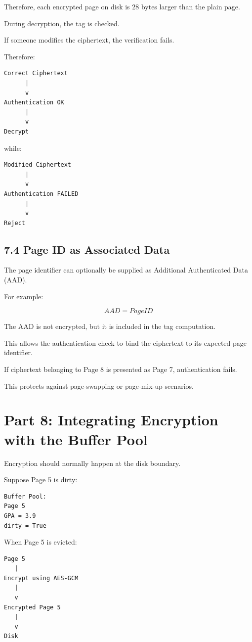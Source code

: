 \documentclass[12pt,a4paper]{article}
\begin{document}
Therefore, each encrypted page on disk is 28 bytes larger than the plain page.

During decryption, the tag is checked.

If someone modifies the ciphertext, the verification fails.

Therefore:

\begin{verbatim}
Correct Ciphertext
      |
      v
Authentication OK
      |
      v
Decrypt
\end{verbatim}

while:

\begin{verbatim}
Modified Ciphertext
      |
      v
Authentication FAILED
      |
      v
Reject
\end{verbatim}

\subsection{7.4 Page ID as Associated Data}

The page identifier can optionally be supplied as Additional Authenticated Data (AAD).

For example:

\[
AAD = PageID
\]

The AAD is not encrypted, but it is included in the tag computation.

This allows the authentication check to bind the ciphertext to its expected page identifier.

If ciphertext belonging to Page 8 is presented as Page 7, authentication fails.

This protects against page-swapping or page-mix-up scenarios.

\section{Part 8: Integrating Encryption with the Buffer Pool}

Encryption should normally happen at the disk boundary.

Suppose Page 5 is dirty:

\begin{verbatim}
Buffer Pool:
Page 5
GPA = 3.9
dirty = True
\end{verbatim}

When Page 5 is evicted:

\begin{verbatim}
Page 5
   |
Encrypt using AES-GCM
   |
   v
Encrypted Page 5
   |
   v
Disk
\end{verbatim}
\end{document}
